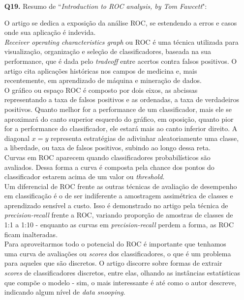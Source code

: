 \documentclass[12pt]{article}
\begin{document}
\begin{enumerate}
\item [\textbf{Q19.}] Resumo de ``\textit{Introduction to ROC analysis, by Tom Fawcett}":
	\begin{addmargin}[1em]{2em}
	O artigo se dedica a exposição da análise ROC, se estendendo a erros e casos onde sua aplicação é indevida.\\
	\textit{Receiver operating characteristics graph} ou ROC é uma técnica utilizada para visualização, organização e seleção de classificadores, baseada na sua performance, que é dada pelo \textit{tradeoff} entre acertos contra falsos positivos. O artigo cita aplicações históricas nos campos de medicina e, mais recentemente, em aprendizado de máquina e mineração de dados.\\
	O gráfico ou espaço ROC é composto por dois eixos, as abcissas representando a taxa de falsos positivos e as ordenadas, a taxa de verdadeiros positivos. Quanto melhor for a performance de um classificador, mais ele se aproximará do canto superior esquerdo do gráfico, em oposição, quanto pior for a performance do classificador, ele estará mais ao canto inferior direito. A diagonal $x=y$ representa estratégias de adivinhar aleatoriamente uma classe, a liberdade, ou taxa de falsos positivos, subindo ao longo dessa reta.\\
	Curvas em ROC aparecem quando classificadores probabilísticos são avaliados. Dessa forma a curva é composta pela chance dos pontos do classificador estarem acima de um valor ou \textit{threshold}.\\
	Um diferencial de ROC frente as outras técnicas de avaliação de desempenho em classificação é o de ser indiferente a amostragem assimétrica de classes e aprendizado sensível a custo. Isso é demonstrado no artigo pela técnica de \textit{precision-recall} frente a ROC, variando proporção de amostras de classes de 1:1 a 1:10 - enquanto as curvas em \textit{precision-recall} perdem a forma, as ROC ficam inalteradas.\\
	Para aproveitarmos todo o potencial do ROC é importante que tenhamos uma curva de avaliações ou \textit{scores} dos classificadores, o que é um problema para aqueles que são discretos. O artigo discorre sobre formas de extrair \textit{scores} de classificadores discretos, entre elas, olhando as instâncias estatísticas que compõe o modelo - sim, o mais interessante é até como o autor descreve, indicando algum nível de \textit{data snooping}.\\

\end{addmargin}
\end{enumerate}
\end{document}
